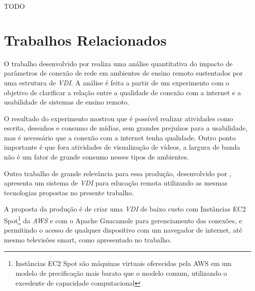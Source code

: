 TODO



\section{Trabalhos Relacionados}\label{sec:trabalhosRelacionados} 

O trabalho desenvolvido por \citet{qoselearning} realiza uma análise quantitativa do impacto de parâmetros de conexão de rede em ambientes de ensino remoto sustentados por uma estrutura de \textit{VDI}. A análise é feita a partir de um experimento com o objetivo de clarificar a relação entre a qualidade de conexão com a internet e a usabilidade de sistemas de ensino remoto.

O resultado do experimento mostrou que é possível realizar atividades como escrita, desenhos e consumo de mídias, sem grandes prejuízos para a usabilidade, mas é necessário que a conexão com a internet tenha qualidade. Outro ponto importante é que fora atividades de visualização de vídeos, a largura de banda não é um fator de grande consumo nesses tipos de ambientes.

Outro trabalho de grande relevância para essa produção, desenvolvido por \citet{edufirestick}, apresenta um sistema de \textit{VDI} para educação remota utilizando as mesmas tecnologias propostas no presente trabalho. 

A proposta da produção é de criar uma \textit{VDI} de baixo custo com Instâncias EC2 Spot\footnote{Instâncias EC2 Spot são máquinas virtuais oferecidas pela AWS em um modelo de precificação mais barato que o modelo comum, utilizando o excedente de capacidade computacional} da \textit{AWS} e com o Apache Guacamole para gerenciamento das conexões, e permitindo o acesso de qualquer dispositivo com um navegador de internet, até mesmo televisões smart, como apresentado no trabalho.

